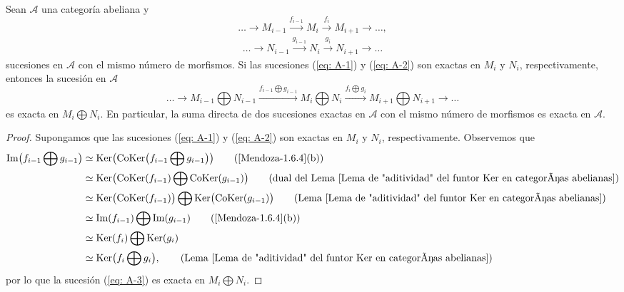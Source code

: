 \documentclass[tesis]{subfiles}
\begin{document}
\begin{Prop}\label{Prop: cerradura de sucesiones exactas cortas por sumas directas finitas en categorías abelianas}
    Sean $\mathscr{A}$ una categoría abeliana y
    \begin{equation}\label{eq: A-1}
        \dots\to M_{i-1}\xrightarrow[]{f_{i-1}} M_i\xrightarrow[]{f_i} M_{i+1}\to \dots,    
    \end{equation}
    \begin{equation}\label{eq: A-2}
        \dots\to N_{i-1}\xrightarrow[]{g_{i-1}} N_i\xrightarrow[]{g_i} N_{i+1}\to \dots
    \end{equation}
    sucesiones en $\mathscr{A}$ con el mismo número de morfismos. Si las sucesiones (\ref{eq: A-1}) y (\ref{eq: A-2}) son exactas en $M_i$ y $N_i$, respectivamente, entonces la sucesión en $\mathscr{A}$
    \begin{equation}\label{eq: A-3}
    \dots\to  M_{i-1}\bigoplus N_{i-1}\xrightarrow[]{f_{i-1}\bigoplus g_{i-1}} M_i\bigoplus N_i\xrightarrow[]{f_i\bigoplus g_i} M_{i+1}\bigoplus N_{i+1} \to \dots
    \end{equation}
    es exacta en $M_i\bigoplus N_i$. En particular, la suma directa de dos sucesiones exactas en $\mathscr{A}$ con el mismo número de morfismos es exacta en $\mathscr{A}$.
\end{Prop}

\begin{proof}
    Supongamos que las sucesiones (\ref{eq: A-1}) y (\ref{eq: A-2}) son exactas en $M_i$ y $N_i$, respectivamente. Observemos que
    \begin{align*}
        \text{Im}\big(f_{i-1}\bigoplus g_{i-1}\big) &\simeq \text{Ker}\big(\text{CoKer}\big(f_{i-1}\bigoplus g_{i-1}\big)\big) \tag{\ref{Mendoza-1.6.4}(b)} \\
                                                    &\simeq \text{Ker}\big(\text{CoKer}(f_{i-1})\bigoplus \text{CoKer}(g_{i-1})\big) \tag{dual del Lema \ref{Lema de "aditividad" del funtor Ker en categorías abelianas}} \\
                                                    &\simeq \text{Ker}\big(\text{CoKer}(f_{i-1})\big)\bigoplus \text{Ker}\big(\text{CoKer}(g_{i-1})\big) \tag{Lema \ref{Lema de "aditividad" del funtor Ker en categorías abelianas}} \\
                                                    &\simeq \text{Im}(f_{i-1})\bigoplus \text{Im}(g_{i-1}) \tag{\ref{Mendoza-1.6.4}(b)} \\
                                    &\simeq \text{Ker}(f_i)\bigoplus \text{Ker}(g_i) \\
                                    &\simeq \text{Ker}\big(f_i\bigoplus g_i\big), \tag{Lema \ref{Lema de "aditividad" del funtor Ker en categorías abelianas}}
    \end{align*}
    por lo que la sucesión (\ref{eq: A-3}) es exacta en $M_i\bigoplus N_i$.
\end{proof}
\end{document}
